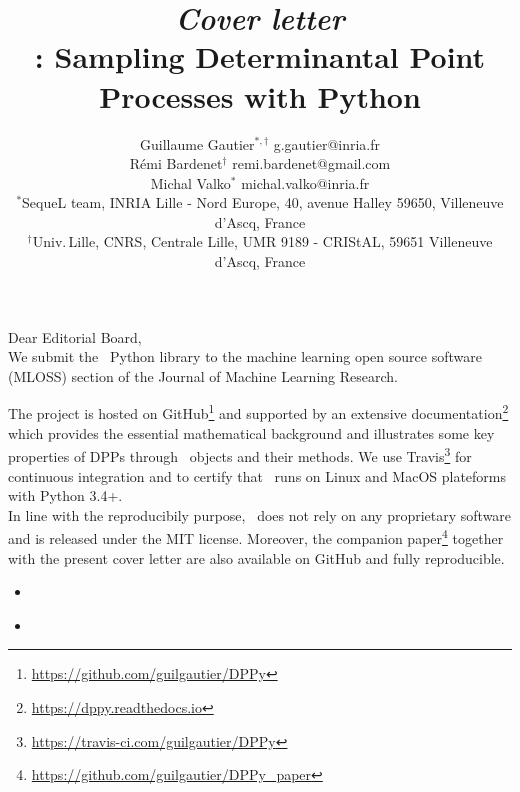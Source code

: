 \documentclass[twoside,11pt]{article}
\begin{document}
\title{\emph{Cover letter}\\[1em]
\DPPy: Sampling Determinantal Point Processes with Python}

\author{\name Guillaume Gautier$^{*,\dagger}$ \email g.gautier@inria.fr \\
       \name R\'emi Bardenet$^\dagger$ \email remi.bardenet@gmail.com \\
       \name Michal Valko$^*$ \email michal.valko@inria.fr\\
       \addr $^*$SequeL team, INRIA Lille - Nord Europe,  40, avenue Halley 59650, Villeneuve d'Ascq, France\\
       \addr $^\dagger$Univ.\,Lille, CNRS, Centrale Lille, UMR 9189 - CRIStAL, 59651 Villeneuve d'Ascq, France
}


\maketitle

\vspace{4em}

\setcounter{footnote}{3}

Dear Editorial Board,\\

We submit the \DPPy\ Python library to the machine learning open source software (MLOSS) section of the Journal of Machine Learning Research.


The project is hosted on GitHub\footnote{\url{https://github.com/guilgautier/DPPy}} and supported by an extensive documentation\footnote{\url{https://dppy.readthedocs.io}} which provides the essential mathematical background and illustrates some key properties of DPPs through \DPPy\ objects and their methods.
We use Travis\footnote{\url{https://travis-ci.com/guilgautier/DPPy}} for continuous integration and to certify that \DPPy\ runs on Linux and MacOS plateforms with Python 3.4+.\\

In line with the reproducibily purpose, \DPPy\ does not rely on any proprietary software and is released under the MIT license.
Moreover, the companion paper\footnote{\url{https://github.com/guilgautier/DPPy_paper}} together with the present cover letter are also available on GitHub and fully reproducible.

\begin{itemize}
  \item {}
  \item {}\\
\end{itemize}
\end{document}

